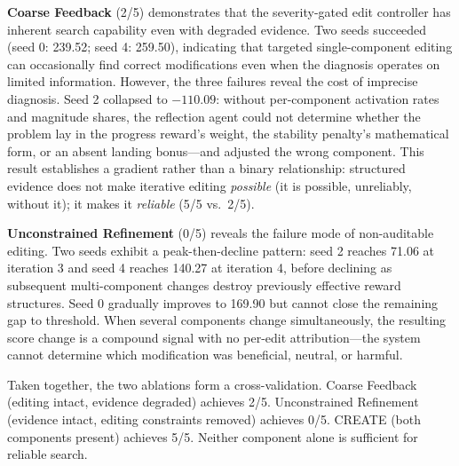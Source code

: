 \documentclass[letterpaper,twocolumn,10pt]{article}
\begin{document}
\textbf{Coarse Feedback} (2/5) demonstrates that the severity-gated edit controller has inherent search capability even with degraded evidence. Two seeds succeeded (seed 0: 239.52; seed 4: 259.50), indicating that targeted single-component editing can occasionally find correct modifications even when the diagnosis operates on limited information. However, the three failures reveal the cost of imprecise diagnosis. Seed 2 collapsed to $-110.09$: without per-component activation rates and magnitude shares, the reflection agent could not determine whether the problem lay in the progress reward's weight, the stability penalty's mathematical form, or an absent landing bonus---and adjusted the wrong component. This result establishes a gradient rather than a binary relationship: structured evidence does not make iterative editing \emph{possible} (it is possible, unreliably, without it); it makes it \emph{reliable} (5/5 vs.\ 2/5).

\textbf{Unconstrained Refinement} (0/5) reveals the failure mode of non-auditable editing. Two seeds exhibit a peak-then-decline pattern: seed 2 reaches 71.06 at iteration 3 and seed 4 reaches 140.27 at iteration 4, before declining as subsequent multi-component changes destroy previously effective reward structures. Seed 0 gradually improves to 169.90 but cannot close the remaining gap to threshold. When several components change simultaneously, the resulting score change is a compound signal with no per-edit attribution---the system cannot determine which modification was beneficial, neutral, or harmful.

Taken together, the two ablations form a cross-validation. Coarse Feedback (editing intact, evidence degraded) achieves 2/5. Unconstrained Refinement (evidence intact, editing constraints removed) achieves 0/5. CREATE (both components present) achieves 5/5. Neither component alone is sufficient for reliable search.

\begin{table}[t]
\centering
\caption{Ablation results on LunarLander-v3. Five search runs per condition. LLM-once = initial generation without iteration. Coarse Feedback = structured evidence replaced with scalar summary. Unconstrained = intervention tiers and single-component constraint removed. Held-out: 100 episodes, seeds 50000--50099. \label{tab:ablation}}
\end{table}
\end{document}
